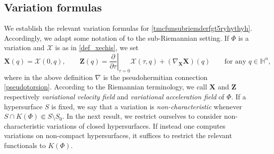 \documentclass[11pt]{amsart}
\newcommand{\hhh}{{\mathcal{H}}}
\newcommand{\tmc}{{\mathscr{H}}}
\newcommand{\hh}{{\mathbb{H}}}
\newcommand{\Y}{\mathcal X}
\newcommand{\X}{\mathbf{X}}
\newcommand{\Z}{\mathbf{Z}}
\theoremstyle{definition}
\theoremstyle{remark}
\numberwithin{equation}{section}
\begin{document}
    \subsection{Variation formulas}
      We establish the relevant variation formulas for \eqref{tmcfunsubriemderfgt5ryhythyh}. Accordingly, we adapt some notation of  to the sub-Riemannian setting. If $\Phi$ is a variation and $\Y$ is as in \eqref{def_xechis}, we set 
      \begin{equation*}
    \X(q)=\Y(0,q),\qquad \Z(q)=\left.\frac{\partial }{\partial \tau}\right|_{\tau=0}\Y(\tau,q)+\left(\nabla_\X\X\right)(q)\qquad\text{for any $q\in \hh^n$,}
\end{equation*}
where in the above definition $\nabla$ is the pseudohermitian connection \eqref{pseudotorsion}.
According to the Riemannian terminology, we call $\X$ and $\Z$ respectively  \emph{variational velocity field} and \emph{variational acceleration field} of $\Phi$. If a hypersurface $S$ is fixed, we say that a variation is \emph{non-characteristic} whenever $S\cap K(\Phi)\Subset S\setminus S_0$. In the next result, we restrict ourselves to consider non-characteristic variations 
of closed hypersurfaces. If instead one computes variations on non-compact hypersurfaces, it suffices to restrict the relevant functionals to $K(\Phi)$. 
\end{document}
